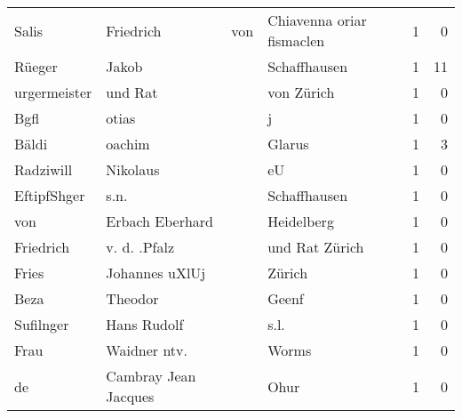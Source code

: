 \begin{center}
\begin{tiny}
\begin{longtabu}{llllrr}
                    Salis &                          Friedrich &         von &                   Chiavenna oriar fismaclen &          1 &         0 \\
                   Rüeger &                              Jakob &             &                                Schaffhausen &          1 &        11 \\
             urgermeister &                            und Rat &             &                                  von Zürich &          1 &         0 \\
                     Bgfl &                              otias &             &                                           j &          1 &         0 \\
                    Bäldi &                             oachim &             &                                      Glarus &          1 &         3 \\
                Radziwill &                           Nikolaus &             &                                          eU &          1 &         0 \\
              EftipfShger &                               s.n. &             &                                Schaffhausen &          1 &         0 \\
                      von &                    Erbach Eberhard &             &                                  Heidelberg &          1 &         0 \\
                Friedrich &                       v. d. .Pfalz &             &                              und Rat Zürich &          1 &         0 \\
                    Fries &                     Johannes uXlUj &             &                                      Zürich &          1 &         0 \\
                     Beza &                            Theodor &             &                                       Geenf &          1 &         0 \\
                Sufilnger &                        Hans Rudolf &             &                                        s.l. &          1 &         0 \\
                     Frau &                       Waidner ntv. &             &                                       Worms &          1 &         0 \\
                       de &               Cambray Jean Jacques &             &                                        Ohur &          1 &         0 \\

\end{longtabu}
\end{tiny}
\end{center}

